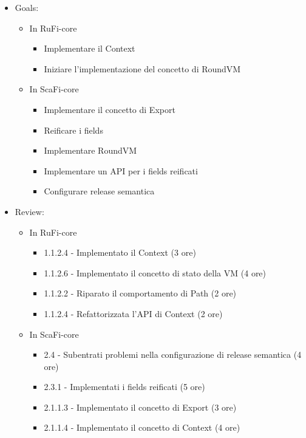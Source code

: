 \documentclass[12pt, a4paper]{article}
\begin{document}
\begin{itemize}
    \item Goals:
          \begin{itemize}
              \color{teal}
              \item In RuFi-core
                    \begin{itemize}
                        \item Implementare il Context
                        \item Iniziare l'implementazione del concetto di RoundVM
                    \end{itemize}
                    \color{cyan}
              \item In ScaFi-core
                    \begin{itemize}
                        \item Implementare il concetto di Export
                        \item Reificare i fields
                        \item Implementare RoundVM
                        \item Implementare un API per i fields reificati
                        \item Configurare release semantica
                    \end{itemize}
          \end{itemize}
    \item Review:
          \begin{itemize}
              \color{teal}
              \item In RuFi-core
                    \begin{itemize}
                        \item 1.1.2.4 - Implementato il Context (3 ore)
                        \item 1.1.2.6 - Implementato il concetto di stato della VM (4 ore)
                        \item 1.1.2.2 - Riparato il comportamento di Path (2 ore)
                        \item 1.1.2.4 - Refattorizzata l'API di Context (2 ore)
                    \end{itemize}
                    \color{cyan}
              \item In ScaFi-core
                    \begin{itemize}
                        \item 2.4 - Subentrati problemi nella configurazione di release semantica (4 ore)
                        \item 2.3.1 - Implementati i fields reificati (5 ore)
                        \item 2.1.1.3 - Implementato il concetto di Export (3 ore)
                        \item 2.1.1.4 - Implementato il concetto di Context (4 ore)
                    \end{itemize}
          \end{itemize}
\end{itemize}
\end{document}
